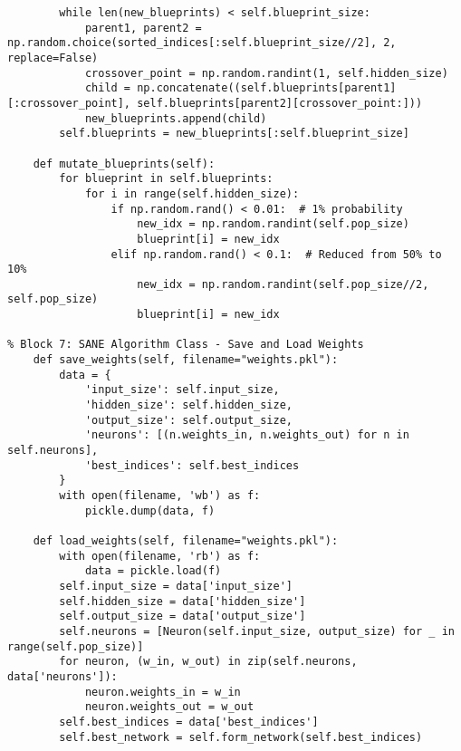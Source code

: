 \documentclass[a4paper,12pt]{article}
\begin{document}
\begin{lstlisting}
        while len(new_blueprints) < self.blueprint_size:
            parent1, parent2 = np.random.choice(sorted_indices[:self.blueprint_size//2], 2, replace=False)
            crossover_point = np.random.randint(1, self.hidden_size)
            child = np.concatenate((self.blueprints[parent1][:crossover_point], self.blueprints[parent2][crossover_point:]))
            new_blueprints.append(child)
        self.blueprints = new_blueprints[:self.blueprint_size]

    def mutate_blueprints(self):
        for blueprint in self.blueprints:
            for i in range(self.hidden_size):
                if np.random.rand() < 0.01:  # 1% probability
                    new_idx = np.random.randint(self.pop_size)
                    blueprint[i] = new_idx
                elif np.random.rand() < 0.1:  # Reduced from 50% to 10%
                    new_idx = np.random.randint(self.pop_size//2, self.pop_size)
                    blueprint[i] = new_idx

% Block 7: SANE Algorithm Class - Save and Load Weights
    def save_weights(self, filename="weights.pkl"):
        data = {
            'input_size': self.input_size,
            'hidden_size': self.hidden_size,
            'output_size': self.output_size,
            'neurons': [(n.weights_in, n.weights_out) for n in self.neurons],
            'best_indices': self.best_indices
        }
        with open(filename, 'wb') as f:
            pickle.dump(data, f)

    def load_weights(self, filename="weights.pkl"):
        with open(filename, 'rb') as f:
            data = pickle.load(f)
        self.input_size = data['input_size']
        self.hidden_size = data['hidden_size']
        self.output_size = data['output_size']
        self.neurons = [Neuron(self.input_size, output_size) for _ in range(self.pop_size)]
        for neuron, (w_in, w_out) in zip(self.neurons, data['neurons']):
            neuron.weights_in = w_in
            neuron.weights_out = w_out
        self.best_indices = data['best_indices']
        self.best_network = self.form_network(self.best_indices)


\end{lstlisting}
\end{document}
